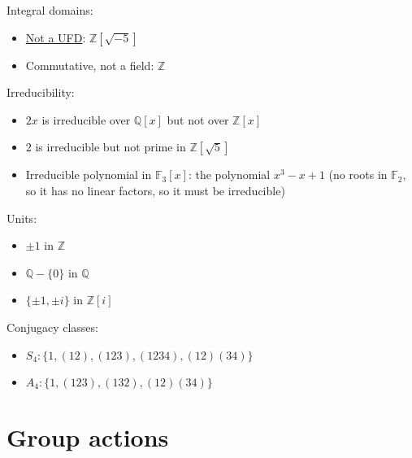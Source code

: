 Integral domains:
    \begin{itemize}
        \item \underline{Not a UFD}: $\mathbb{Z}[\sqrt{-5}]$
        \item Commutative, not a field: $\mathbb{Z}$
    \end{itemize}
    
Irreducibility:
    \begin{itemize}
        \item $2x$ is irreducible over $\mathbb{Q}[x]$ but not over $\mathbb{Z}[x]$
        \item $2$ is irreducible but not prime in $\mathbb{Z}[\sqrt{5}]$
        \item Irreducible polynomial in $\mathbb{F}_3[x]$: the polynomial $x^3 - x + 1$ (no roots in $\mathbb{F}_2$, so it has no linear factors, so it must be irreducible)
    \end{itemize}
    
Units:
    \begin{itemize}
        \item $\pm 1$ in $\mathbb{Z}$
        \item $\mathbb{Q} - \{0\}$ in $\mathbb{Q}$
        \item $\{\pm 1, \pm i\}$ in $\mathbb{Z}[i]$
    \end{itemize}

Conjugacy classes:
    \begin{itemize}
        \item $S_4 : \{ 1, (12), (123), (1234), (12)(34) \}$
        \item $A_4 : \{ 1, (123), (132), (12)(34) \}$
    \end{itemize}

\newpage


\section{Group actions}

